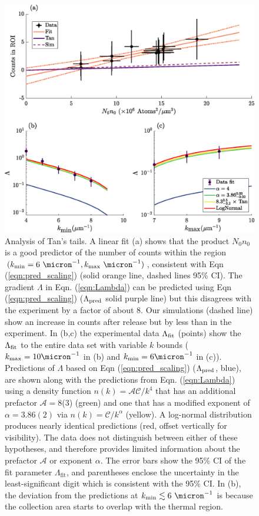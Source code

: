 	
	\begin{figure}
	\begin{center}
		\includegraphics[width=\columnwidth]{fig/depletion/exp_results_plus.eps}
			\caption{{Analysis of Tan's tails.} A linear fit (a) shows that the product $N_0n_0$ is a good predictor of the number of counts within the region $(k_\textrm{min}=6~\micron^{-1},k_\textrm{max}~\micron^{-1})$, consistent with Eqn (\ref{eqn:pred_scaling}) 
			(solid orange line, dashed lines 95\% CI). The gradient {$\Lambda$} %
			{in Eqn. (\ref{eqn:Lambda})} can be predicted using Eqn (\ref{eqn:pred_scaling}) ({$\Lambda_{\rm pred}$} solid purple line) but this disagrees with the experiment by a factor of about 8. Our simulations (dashed line) show an increase in counts after release but by less than in the experiment. 
			In (b,c) the {experimental} data {$\Lambda_{\rm fit}$} (points) show the $\Lambda_{\rm fit}$ to the entire data set with variable $k$ bounds ($k_\textrm{max}=10\micron^{-1}$ in (b) and $k_\textrm{min}=6\micron^{-1}$ in (c)).
			Predictions of $\Lambda$ based on Eqn (\ref{eqn:pred_scaling}) ({$\Lambda_{\rm pred}$}, blue), are shown along with the predictions {from Eqn. (\ref{eqn:Lambda}) using} a density function $n(k){=\mathcal{AC}/k^4}$ that {has an additional prefactor $\mathcal{A}=$8(3)} %
			(green) and one that has %
			a modified exponent of {$\alpha=3.86(2)$ via $n(k)=\mathcal{C}/k^{\alpha}$} (yellow). 
			{A log-normal distribution produces nearly identical predictions (red, offset vertically for visibility).}
			The data does not distinguish between either of these hypotheses, and therefore provides limited information about {the prefactor $\mathcal{A}$ or exponent}%
			$\alpha$.
			The error bars show the 95\% CI of the fit parameter $\Lambda_\textrm{fit}$, and parentheses enclose the uncertainty in the least-significant digit which is consistent with the 95\% CI.
			In (b), the deviation from the predictions at $k_\textrm{min}\lesssim6~\micron^{-1}$ is because the collection area starts to overlap with the thermal region.
			}


\end{center}
\end{figure}
